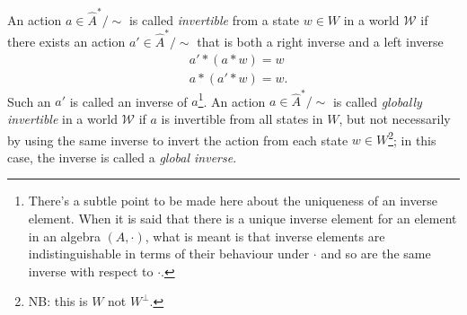 An action $a \in \hat{A}^{*}/\sim$ is called \emph{invertible} from a state $w \in W$ in a world $\mathscr{W}$ if there exists an action $a' \in \hat{A}^{*}/\sim$ that is both a right inverse and a left inverse
\begin{equation}
\begin{aligned}
    & a' * (a * w) = w \\
    & a * (a' * w) = w.
\end{aligned}
\end{equation}
Such an $a'$ is called an inverse of $a$\footnote{
There's a subtle point to be made here about the uniqueness of an inverse element.
When it is said that there is a unique inverse element for an element in an algebra $(A, \cdot)$, what is meant is that inverse elements are indistinguishable in terms of their behaviour under $\cdot$ and so are the same inverse with respect to $\cdot$.
}.
An action $a \in \hat{A}^{*}/\sim$ is called \emph{globally invertible} in a world $\mathscr{W}$ if $a$ is invertible from all states in $W$, but not necessarily by using the same inverse to invert the action from each state $w \in W$\footnote{
NB: this is $W$ not $W^{\bot}$.
}; in this case, the inverse is called a \emph{global inverse}.

